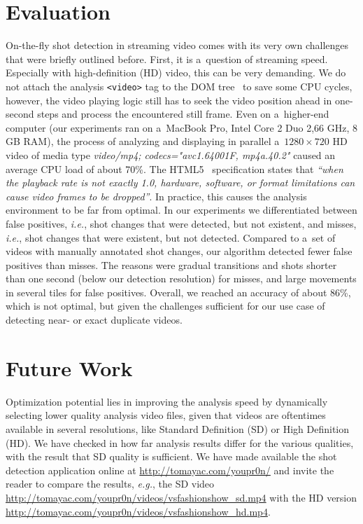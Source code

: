 \section{Evaluation}

On-the-fly shot detection in streaming video
comes with its very own challenges that were briefly outlined before.
First, it is a~question of streaming speed.
Especially with high-definition (HD) video,
this can be very demanding.
We do not attach the analysis \texttt{<video>} tag
to the DOM tree~\cite{lehors2004dom} to save some CPU cycles,
however, the video playing logic still has to seek the video position
ahead in one-second steps  and process the encountered still frame.
Even on a~higher-end computer (our experiments ran on a~MacBook
Pro, Intel Core 2 Duo 2,66 GHz, 8 GB RAM),
the process of analyzing and displaying in parallel
a~$\mathit{1280} \times \mathit{720}$ HD video of media type
\emph{video/mp4; codecs="avc1.64001F, mp4a.40.2"}
caused an average CPU load of about 70\%.
The HTML5~\cite{berjon2012html5} specification states that
\textit{``when the playback rate is not exactly 1.0,
hardware, software, or format limitations can cause video frames
to be dropped''}.
In practice, this causes the analysis environment
to be far from optimal.
In our experiments we differentiated between false positives,
\emph{i.e.}, shot changes that were detected,
but not existent, and misses, \emph{i.e.},
shot changes that were existent,
but not detected.
Compared to a~set of videos with manually annotated shot changes,
our algorithm detected fewer false positives than misses.
The reasons were gradual transitions and shots
shorter than one second (below our detection resolution)
for misses, and large movements in several tiles
for false positives.
Overall, we reached an accuracy of about 86\%,
which is not optimal, but given the challenges
sufficient for our use case of
detecting near- or exact duplicate videos. 

\section{Future Work}

Optimization potential lies in
improving the analysis speed by dynamically selecting
lower quality analysis video files,
given that videos are oftentimes available in several resolutions,
like Standard Definition (SD) or High Definition (HD).
We have checked in how far analysis results differ
for the various qualities,
with the result that SD quality is sufficient.
We have made available the shot detection application online at
\url{http://tomayac.com/youpr0n/} and invite the reader to compare
the results, \emph{e.g.}, the SD video
\url{http://tomayac.com/youpr0n/videos/vsfashionshow_sd.mp4} with
the HD version \url{http://tomayac.com/youpr0n/videos/vsfashionshow_hd.mp4}.

